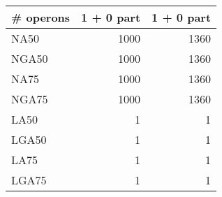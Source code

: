 \begin{table}[ht]
\begin{center}
\begin{tabular}{|l*{2}{|r}|}
\# operons & 1 + 0 part & 1 + 0 part \\ \hline
NA50 & 1000 & 1360 \\ \hline
NGA50 & 1000 & 1360 \\ \hline
NA75 & 1000 & 1360 \\ \hline
NGA75 & 1000 & 1360 \\ \hline
LA50 & 1 & 1 \\ \hline
LGA50 & 1 & 1 \\ \hline
LA75 & 1 & 1 \\ \hline
LGA75 & 1 & 1 \\ \hline
\end{tabular}
\end{center}
\end{table}
